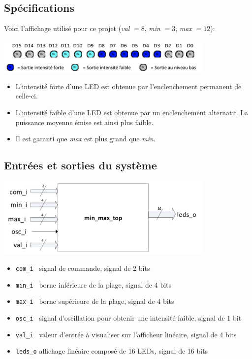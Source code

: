 \subsection{Spécifications}

Voici l'affichage utilisé pour ce projet (\textit{val} $= 8$, \textit{min} $= 3$, \textit{max} $= 12$):

\begin{minipage}{\textwidth}
	\center
	\includegraphics[width=0.8\textwidth]{figures/specs_ex.png}
\end{minipage}

\begin{itemize}
	\item L'intensité forte d'une LED est obtenue par l'enclenchement permanent de celle-ci.
	\item L'intensité faible d'une LED est obtenue par un enclenchement alternatif. La puissance moyenne émise est ainsi plus faible.
	\item Il est garanti que \textit{max} est plus grand que \textit{min}.
\end{itemize}

\subsection{Entrées et sorties du système}

\begin{minipage}{\textwidth}
	\center
	\includegraphics[width=0.8\textwidth]{figures/specs_io.png}
\end{minipage}

\begin{itemize}
	\item \texttt{com\_i } \qquad signal de commande, signal de 2 bits
	\item \texttt{min\_i } \qquad borne inférieure de la plage, signal de 4 bits
	\item \texttt{max\_i } \qquad borne supérieure de la plage, signal de 4 bits
	\item \texttt{osc\_i } \qquad signal d'oscillation pour obtenir une intensité faible, signal de 1 bit
	\item \texttt{val\_i } \qquad valeur d'entrée à visualiser sur l'afficheur linéaire, signal de 4 bits
	\item \texttt{leds\_o} \qquad affichage linéaire composé de 16 LEDs, signal de 16 bits
\end{itemize}


